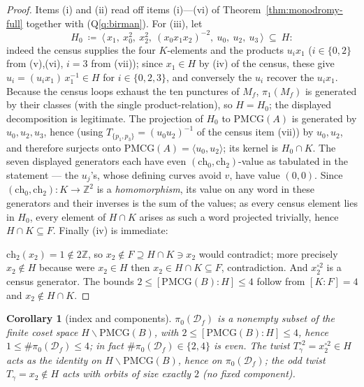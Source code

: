 \documentclass[11pt]{article}
\newtheorem{corollary}[theorem]{Corollary}
\theoremstyle{definition}
\theoremstyle{remark}
\newcommand{\PMCG}{\mathrm{PMCG}}
\newcommand{\Df}{\mathcal D_f}
\begin{document}
\begin{proof}
Items (i) and (ii) read off items (i)—(vi) of
Theorem~\ref{thm:monodromy-full} together with (Q\ref{q:birman}).
For (iii), let
\[
H_0\ \coloneqq\ \bigl\langle\,x_1,\ x_0^2,\ x_2^2,\ (x_0x_1x_2)^{-2},\
u_0,\ u_2,\ u_3\,\bigr\rangle\ \subseteq\ H:
\]
indeed the census supplies the four $K$-elements and the products
$u_i x_1$ ($i\in\{0,2\}$ from (v),(vi), $i=3$ from (vii)); since
$x_1\in H$ by (iv) of the census, these give
$u_i=(u_ix_1)\,x_1^{-1}\in H$ for $i\in\{0,2,3\}$, and conversely the
$u_i$ recover the $u_ix_1$.  Because the census loops exhaust the ten
punctures of $M_f$, $\pi_1(M_f)$ is generated by their classes (with
the single product-relation), so $H=H_0$; the displayed decomposition
is legitimate.  The projection of $H_0$ to $\PMCG(A)$ is generated
by $u_0,u_2,u_3$, hence (using
$T_{\{p_1,p_3\}}=(u_0u_2)^{-1}$ of the census item (vii)) by
$u_0,u_2$, and therefore surjects onto
$\PMCG(A)=\langle u_0,u_2\rangle$; its kernel is $H_0\cap K$.  The
seven displayed generators each have even
$(\mathrm{ch}_0,\mathrm{ch}_2)$-value as tabulated in the statement —
the $u_j$'s, whose defining curves avoid $v$, have value $(0,0)$.
Since $(\mathrm{ch}_0,\mathrm{ch}_2):K\to\mathbb Z^2$ is a
\emph{homomorphism}, its value on any word in these generators and
their inverses is the sum of the values; as every census element lies
in $H_0$, every element of $H\cap K$ arises as such a word projected
trivially, hence $H\cap K\subseteq F$.  Finally (iv) is immediate:

$\mathrm{ch}_2(x_2)=1\notin2\mathbb Z$, so $x_2\notin F\supseteq
H\cap K\ni x_2$ would contradict; more precisely
$x_2\notin H$ because were $x_2\in H$ then $x_2\in H\cap K\subseteq
F$, contradiction.  And $x_2^{\circ2}$ is a census generator.
The bounds $2\le[\PMCG(B):H]\le4$ follow from
$[K:F]=4$ and $x_2\notin H\cap K$.
\end{proof}

\begin{corollary}[index and components]\label{cor:index}
$\pi_0(\Df)$ is a nonempty subset of the finite coset space
$H\backslash\PMCG(B)$, with $2\le[\PMCG(B):H]\le 4$, hence
$1\le\#\pi_0(\Df)\le4$; in fact $\#\pi_0(\Df)\in\{2,4\}$ is even.
The twist $T_\gamma^{\circ2}=x_2^{\circ2}\in H$ acts as the identity on
$H\backslash\PMCG(B)$, hence on $\pi_0(\Df)$; the odd twist
$T_\gamma=x_2\notin H$ acts with orbits of size exactly $2$
\textup{(}no fixed component\textup{)}.
\end{corollary}
\end{document}
